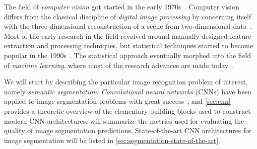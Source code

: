 The field of \textit{computer vision} got started in the early 1970s~\cite[p.~10]{computer_vision_history}.
Computer vision differs from the classical discipline of \textit{digital image processing} by concerning itself with the three-dimensional reconstruction of a scene from two-dimensional data~\cite[p.~10]{computer_vision_history}.
Most of the early research in the field revolved around manually designed feature extraction and processing techniques, but statistical techniques started to become popular in the 1990s~\cite[p.~15]{computer_vision_history}.
The statistical approach eventually morphed into the field of \textit{machine learning}, where most of the research advances are made today~\cite[p.~17]{computer_vision_history}.

We will start by describing the particular image recognition problem of interest, namely \textit{semantic segmentation}.
\textit{Convolutional neural networks} (CNNs) have been applied to image segmentation problems with great success~\cite[p.~1]{image_recognition}, and \cref{sec:cnn} provides a theoretic overview of the elementary building blocks used to construct modern CNN architectures.
 will summarize the metrics used for evaluating the quality of image segmentation predictions.
State-of-the-art CNN architectures for image segmentation will be listed in \cref{sec:segmentation-state-of-the-art}.
